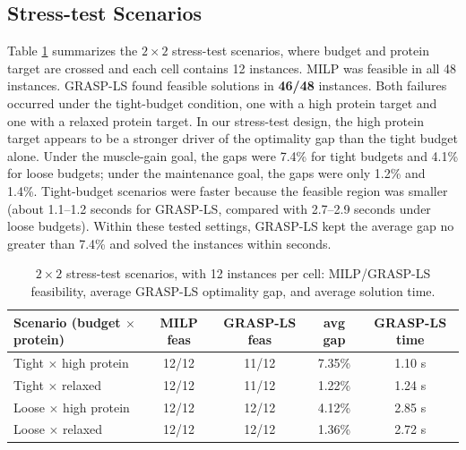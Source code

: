 \documentclass[a4paper]{article}
\begin{document}
\subsection{Stress-test Scenarios}\label{sec:stress}
Table \ref{tab:stress} summarizes the $2\times2$ stress-test scenarios, where budget and protein target are crossed and each cell contains 12 instances. MILP was feasible in all 48 instances. GRASP-LS found feasible solutions in \textbf{46/48} instances. Both failures occurred under the tight-budget condition, one with a high protein target and one with a relaxed protein target. In our stress-test design, the high protein target appears to be a stronger driver of the optimality gap than the tight budget alone. Under the muscle-gain goal, the gaps were 7.4\% for tight budgets and 4.1\% for loose budgets; under the maintenance goal, the gaps were only 1.2\% and 1.4\%. Tight-budget scenarios were faster because the feasible region was smaller (about 1.1--1.2 seconds for GRASP-LS, compared with 2.7--2.9 seconds under loose budgets). Within these tested settings, GRASP-LS kept the average gap no greater than 7.4\% and solved the instances within seconds.
\begin{table}[htbp]
\centering\normalsize
\caption{$2\times2$ stress-test scenarios, with 12 instances per cell: MILP/GRASP-LS feasibility, average GRASP-LS optimality gap, and average solution time.}
\label{tab:stress}
\begin{tabular}{lcccc}
\toprule
Scenario (budget $\times$ protein) & MILP feas & GRASP-LS feas & avg gap & GRASP-LS time \\
\midrule
Tight $\times$ high protein & 12/12 & 11/12 & 7.35\% & 1.10 s \\
Tight $\times$ relaxed      & 12/12 & 11/12 & 1.22\% & 1.24 s \\
Loose $\times$ high protein & 12/12 & 12/12 & 4.12\% & 2.85 s \\
Loose $\times$ relaxed      & 12/12 & 12/12 & 1.36\% & 2.72 s \\
\bottomrule
\end{tabular}
\end{table}
\end{document}
